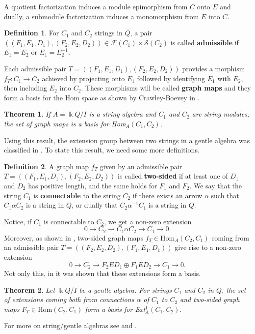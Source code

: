 \documentclass[12pt]{amsart}
\theoremstyle{plain}
\newtheorem{thm}{Theorem}[section]
\theoremstyle{definition}
\newtheorem{defn}{Definition}[section]
\theoremstyle{remark}
\begin{document}
{A quotient factorization induces a module epimorphism from $C$ onto $E$ and dually, a submodule factorization induces a monomorphism from $E$ into $C$. 

\begin{defn}
For $C_1$ and $C_2$ strings in $Q$, a pair $((F_1,E_1,D_1),(F_2,E_2,D_2)) \in \mathcal{F}(C_1) \times \mathcal{S}(C_2)$ is called \textbf{admissible} if $E_1 = E_2$ or $E_1 = E_2^{-1}$.
\end{defn}

Each admissible pair $T = ((F_1,E_1,D_1),(F_2,E_2,D_2))$ provides a morphism $f_T:C_1 \rightarrow C_2$ achieved by projecting onto $E_1$ followed by identifying $E_1$ with $E_2$, then including $E_2$ into $C_2$. These morphisms will be called \textbf{graph maps} and they form a basis for the Hom space as shown by Crawley-Boevey in \cite{CBstrings}.

\begin{thm}\label{thm: basis for Hom}
If $A = \Bbbk Q /I$ is a string algebra and $C_1$ and $C_2$ are string modules, the set of graph maps is a basis for Hom$_A(C_1,C_2)$.
\end{thm} 

Using this result, the extension group between two strings in a gentle algebra was classified in \cite{brustle2020combinatorics}. To state this result, we need some more definitions.

\begin{defn}
A graph map $f_T$ given by an admissible pair $T = ((F_1,E_1,D_1),(F_2,E_2,D_2))$ is called \textbf{two-sided} if at least one of $D_1$ and $D_2$ has positive length, and the same holds for $F_1$ and $F_2$. We say that the string $C_1$ is \textbf{connectable} to the string $C_2$ if there exists an arrow $\alpha$ such that $C_1\alpha C_2$ is a string in $Q$, or dually that $C_2\alpha^{-1}C_1$ is a string in $Q$.
\end{defn}

Notice, if $C_1$ is connectable to $C_2$, we get a non-zero extension $$0 \rightarrow C_2 \rightarrow C_1\alpha C_2 \rightarrow C_1 \rightarrow 0.$$ Moreover, as shown in \cite{schroer1999modules}, two-sided graph maps $f_T\in\text{Hom}_A(C_2,C_1)$ coming from an admissible pair $T = ((F_2,E_2,D_2),(F_1,E_1,D_1))$ give rise to a non-zero extension $$0\rightarrow C_2 \rightarrow F_2ED_1 \oplus F_1ED_2 \rightarrow C_1 \rightarrow 0.$$ Not only this, in \cite{brustle2020combinatorics} it was shown that these extensions form a basis.

\begin{thm}\label{thm: basis for ext}
Let $\Bbbk Q/I$ be a gentle algebra. For strings $C_1$ and $C_2$ in $Q$, the set of extensions coming both from connections $\alpha$ of $C_1$ to $C_2$ and two-sided graph maps $F_T \in \text{Hom}(C_2,C_1)$ form a basis for Ext$^1_{A}(C_1,C_2)$.
\end{thm}
}
\noindent
 For more on string/gentle algebras see \cite{StringAlgebraInfo} and \cite{CBstrings}. 
\end{document}
